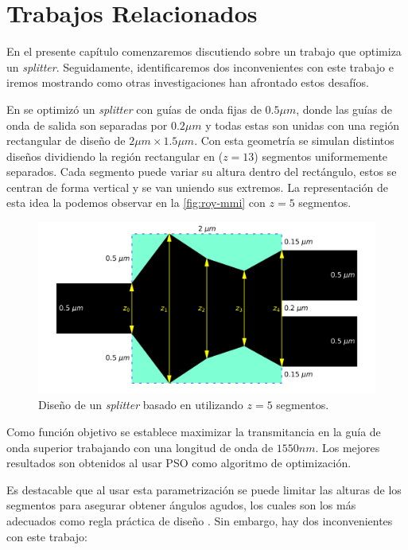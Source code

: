 \chapter{Trabajos Relacionados}\label{chapter:related-works}

En el presente capítulo comenzaremos discutiendo sobre un trabajo que optimiza un \emph{splitter}.
Seguidamente, identificaremos dos inconvenientes con este trabajo e iremos mostrando como otras 
investigaciones han afrontado estos desafíos.

En \cite{Prosopio-Galarza2019} se optimizó un \emph{splitter} con guías de onda fijas de $0.5 \mu m$, 
donde las guías de onda de salida son separadas por $0.2 \mu m$ y 
todas estas son unidas con una región rectangular de diseño de $2 \mu m \times 1.5 \mu m$.
Con esta geometría se simulan distintos diseños dividiendo la región rectangular en ($z = 13$) segmentos
uniformemente separados.
Cada segmento puede variar su altura dentro del rectángulo, estos se centran de forma vertical y
se van uniendo sus extremos. 
La representación de esta idea la podemos observar en la \autoref{fig:roy-mmi} con $z = 5$ segmentos.

\begin{figure}[ht]
  \centering
  \includegraphics[scale=0.5]{image/related-works/mmi-angles.png}
  \caption{Diseño de un \emph{splitter} basado en \citep{Prosopio-Galarza2019} utilizando $z = 5$ segmentos.} 
  \label{fig:roy-mmi}
\end{figure}

Como función objetivo se establece maximizar la transmitancia en la guía de onda superior trabajando con una
longitud de onda de $1550 nm$.
Los mejores resultados son obtenidos al usar PSO como algoritmo de optimización.

Es destacable que al usar esta parametrización se puede limitar las alturas de los segmentos para asegurar 
obtener ángulos agudos, los cuales son los más adecuados como regla práctica de diseño
\citep{LukasChrostowski2010}.
Sin embargo, hay dos inconvenientes con este trabajo:

